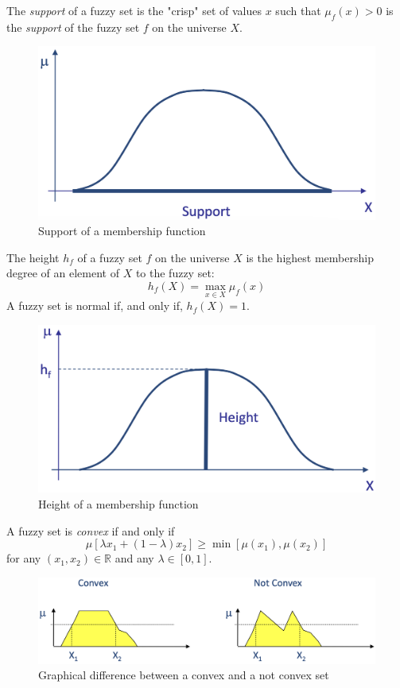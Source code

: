 \documentclass[12pt, a4paper]{report}
\newtheorem[L]{theorem}{Theorem}
\newtheorem[M]{corollary}{Corollary}
\newtheorem[M]{lemma}{Lemma}
\newtheorem[style=S,bodystyle=\normalfont]{definition}{Definition}
\begin{document}
    \begin{definition}[H]
        The \emph{support} of a fuzzy set is the "crisp" set of values $x$ such that $\mu_f(x)>0$ is the \emph{support} of the fuzzy set
        $f$ on the universe $X$.
    \end{definition}
    \begin{figure}[H]
        \centering
        \includegraphics[width=0.5\linewidth]{images/support.png}
        \caption{Support of a membership function}
    \end{figure}
    \begin{definition}
        The height $h_f$ of a fuzzy set $f$ on the universe $X$ is the highest membership degree of an element of $X$ to the fuzzy set:
        \[h_f(X)=\max_{x \in X}\mu_f(x)\]
        A fuzzy set is normal if, and only if, $h_f(X)=1$.
    \end{definition}
    \begin{figure}[H]
        \centering
        \includegraphics[width=0.5\linewidth]{images/height.png}
        \caption{Height of a membership function}
    \end{figure}
    \begin{definition}
        A fuzzy set is \emph{convex} if and only if 
        \[\mu[\lambda x_1+(1-\lambda)x_2] \geq \min [\mu(x_1),\mu(x_2)]\]
        for any $(x_1,x_2) \in \mathbb{R}$ and any $\lambda \in [0,1]$.
    \end{definition}
    \begin{figure}[H]
        \centering
        \includegraphics[width=0.75\linewidth]{images/convex.png}
        \caption{Graphical difference between a convex and a not convex set}
    \end{figure}
\end{document}
